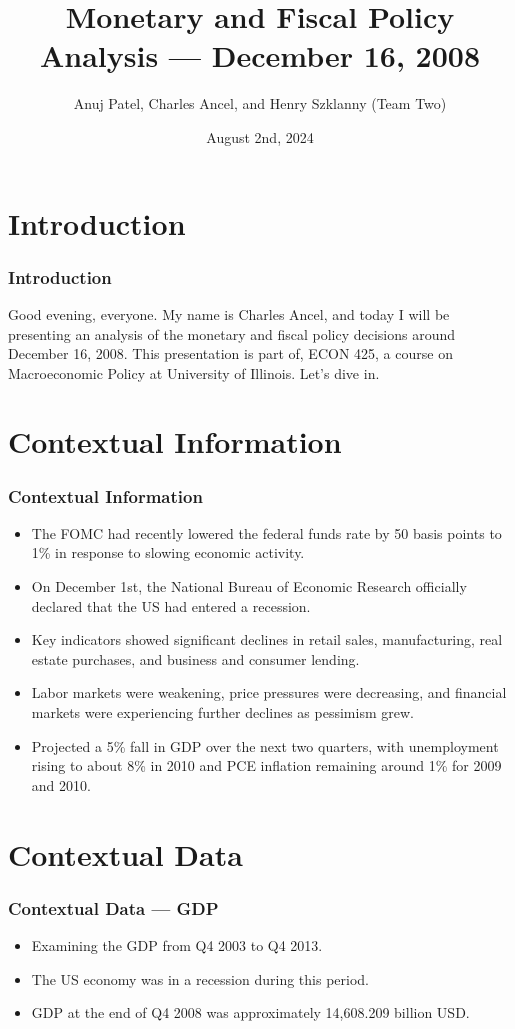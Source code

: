 \documentclass{beamer}
\title{Monetary and Fiscal Policy Analysis --- December 16, 2008}
\author{Anuj Patel, Charles Ancel, and Henry Szklanny (Team Two)}
\date{August 2nd, 2024}
\begin{document}
\frame{\titlepage}

\section{Introduction}
\begin{frame}
    \frametitle{Introduction}
    Good evening, everyone. My name is Charles Ancel, and today I will be presenting an analysis of the monetary and fiscal policy decisions around December 16, 2008. This presentation is part of, ECON 425, a course on Macroeconomic Policy at University of Illinois. Let's dive in.
\end{frame}

\section{Contextual Information}
\begin{frame}
    \frametitle{Contextual Information}
    \begin{itemize}
        \item The FOMC had recently lowered the federal funds rate by 50 basis points to 1\% in response to slowing economic activity.
        \item On December 1st, the National Bureau of Economic Research officially declared that the US had entered a recession.
        \item Key indicators showed significant declines in retail sales, manufacturing, real estate purchases, and business and consumer lending.
        \item Labor markets were weakening, price pressures were decreasing, and financial markets were experiencing further declines as pessimism grew.
        \item Projected a 5\% fall in GDP over the next two quarters, with unemployment rising to about 8\% in 2010 and PCE inflation remaining around 1\% for 2009 and 2010.
    \end{itemize}
\end{frame}

\section{Contextual Data}
\begin{frame}
    \frametitle{Contextual Data --- GDP}
    \begin{itemize}
        \item Examining the GDP from Q4 2003 to Q4 2013.
        \item The US economy was in a recession during this period.
        \item GDP at the end of Q4 2008 was approximately 14,608.209 billion USD.
    \end{itemize}

\end{frame}
\end{document}
